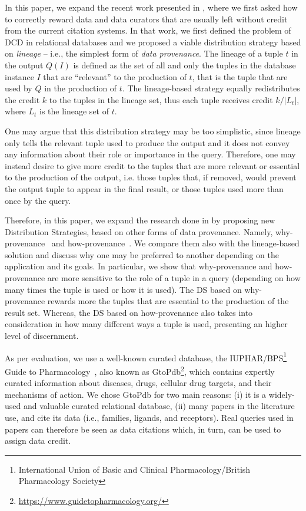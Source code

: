 In this paper, we expand the recent work presented in \citep{dosso2020data}, where we first asked how to correctly reward data and data curators that are usually left without credit from the current citation systems.
In that work, we first defined the problem of DCD in relational databases and we proposed a viable distribution strategy based on \emph{lineage} -- i.e., the simplest form of \emph{data provenance}. The lineage of a tuple $t$ in the output $Q(I)$ is defined as the set of all and only the tuples in the database instance $I$ that are ``relevant'' to the production of $t$, that is the tuple that are used by $Q$ in the production of $t$. 
The lineage-based strategy equally redistributes the credit $k$ to the tuples in the lineage set, thus each tuple receives credit $k/|L_t|$, where $L_t$ is the lineage set of $t$. 

One may argue that this distribution strategy may be too simplistic, since lineage only tells the relevant tuple used to produce the output and it does not convey any information about their role or importance in the query.
Therefore, one may instead desire to give more credit to the tuples that are more relevant or essential to the production of the output, i.e. those tuples that, if removed, would prevent the output tuple to appear in the final result, or those tuples used more than once  by the query. 

Therefore, in this paper, we expand the research done in \citep{dosso2020data} by proposing new Distribution Strategies, based on other forms of data provenance. 
Namely, why-provenance~\citep{WhyProvBuneman} and how-provenance~\citep{howProvenanceGreen}. 
We compare them also with the lineage-based solution and discuss why one may be preferred to another depending on the application and its goals. 
In particular, we show that why-provenance and how-provenance are more sensitive to the role of a tuple in a query (depending on how many times the tuple is used or how it is used). 
The DS based on why-provenance rewards more the tuples that are essential to the production of the result set.
Whereas, the DS based on how-provenance also takes into consideration in how many different ways a tuple is used, presenting an higher level of discernment. 

As per evaluation, we use a well-known curated database, the IUPHAR/BPS\footnote{International Union of Basic and Clinical Pharmacology/British Pharmacology Society} Guide to Pharmacology~\citep{iuphar2018}, also known as GtoPdb\footnote{\url{https://www.guidetopharmacology.org/}}, which contains expertly curated information about diseases, drugs, cellular drug targets, and their mechanisms of action.
We chose GtoPdb for two main reasons: (i) it is a widely-used and valuable curated relational database, (ii) many papers in the literature use, and cite its data (i.e., families, ligands, and receptors). 
Real queries used in papers can therefore be seen as data citations which, in turn, can be used to assign data credit.


